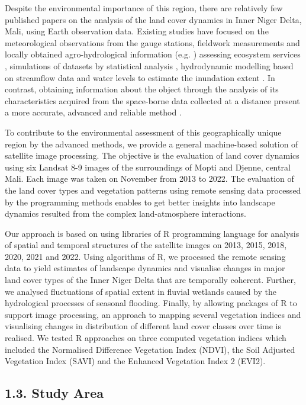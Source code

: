 \documentclass[12pt,a4paper,oneside]{article}
\def \newpar{\vspace{6pt}}
\begin{document}
\newpar Despite the environmental importance of this region, there are relatively few published papers on the analysis of the land cover dynamics in Inner Niger Delta, Mali, using Earth observation data. Existing studies have focused on the meteorological observations from the gauge stations, fieldwork measurements and locally obtained agro-hydrological information (e.g. \cite{dadson2010wetland}) assessing ecosystem services \citep{REBELO201358}, simulations of datasets by statistical analysis \citep{Mascaro}, hydrodynamic modelling based on streamflow data and water levels to estimate the inundation extent \citep{HAQUE2020100703,HAQUE2021104187}. In contrast, obtaining information about the object through the analysis of its characteristics acquired from the space-borne data collected at a distance present a more accurate, advanced and reliable method \citep{Maini,rs70202127}. 

To contribute to the environmental assessment of this geographically unique region by the advanced methods, we provide a general machine-based solution of satellite image processing. The objective is the evaluation of land cover dynamics using six Landsat 8-9 images of the surroundings of Mopti and Djenne, central Mali. Each image was taken on November from 2013 to 2022. The evaluation of the land cover types and vegetation patterns using remote sensing data processed by the programming methods enables to get better insights into landscape dynamics resulted from the complex land-atmosphere interactions.

\newpar Our approach is based on using libraries of R programming language for analysis of spatial and temporal structures of the satellite images on 2013, 2015, 2018, 2020, 2021 and 2022. Using algorithms of R, we processed the remote sensing data to yield estimates of landscape dynamics and visualise changes in major land cover types of the Inner Niger Delta that are temporally coherent. Further, we analysed fluctuations of spatial extent in fluvial wetlands caused by the hydrological processes of seasonal flooding. Finally, by allowing packages of R to support image processing, an approach to mapping several vegetation indices and visualising changes in distribution of different land cover classes over time is realised. We tested R approaches on three computed vegetation indices which included the Normalised Difference Vegetation Index (NDVI), the Soil Adjusted Vegetation Index (SAVI) and the Enhanced Vegetation Index 2 (EVI2).

\subsection*{1.3. Study Area}
\end{document}
